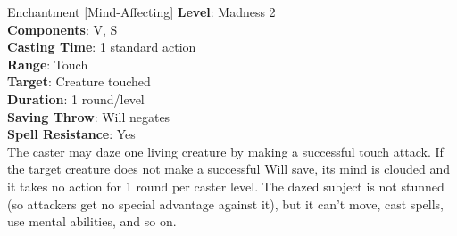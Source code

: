 {Enchantment [Mind-Affecting]}
{
	\textbf{Level}: Madness 2\\
	\textbf{Components}: V, S\\
	\textbf{Casting Time}: 1 standard action\\
	\textbf{Range}: Touch\\
	\textbf{Target}: Creature touched\\
	\textbf{Duration}: 1 round/level\\
	\textbf{Saving Throw}: Will negates\\
	\textbf{Spell Resistance}: Yes\\
}
{
	The caster may daze one living creature by making a successful touch attack. If the target creature does not make a successful Will save, its mind is clouded and it takes no action for 1 round per caster level. The dazed subject is not stunned (so attackers get no special advantage against it), but it can’t move, cast spells, use mental abilities, and so on.
}